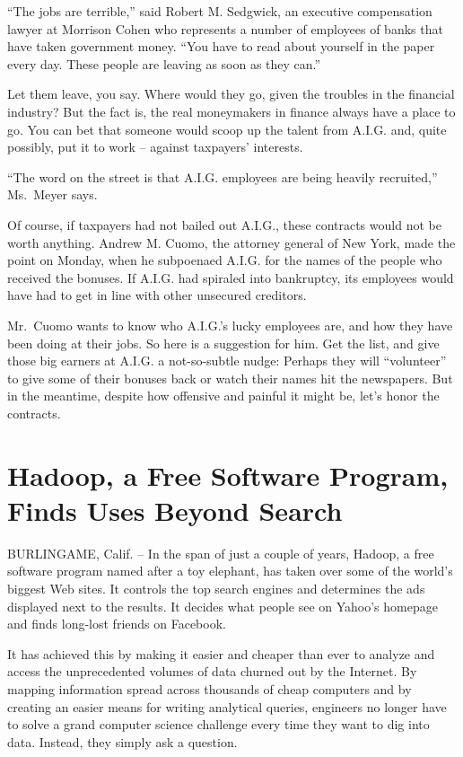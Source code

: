 \documentclass[12pt,a4paper,onecolumn]{article}
\begin{document}
\begin{CJK*}{GBK}{song}
``The jobs are terrible,'' said Robert M. Sedgwick, an executive compensation lawyer at Morrison
Cohen who represents a number of employees of banks that have taken government money. ``You have to
read about yourself in the paper every day. These people are leaving as soon as they can.''

Let them leave, you say. Where would they go, given the troubles in the financial industry? But the
fact is, the real moneymakers in finance always have a place to go. You can bet that someone would
scoop up the talent from A.I.G. and, quite possibly, put it to work -- against taxpayers' interests.

``The word on the street is that A.I.G. employees are being heavily recruited,'' Ms.~Meyer says.

Of course, if taxpayers had not bailed out A.I.G., these contracts would not be worth anything.
Andrew M. Cuomo, the attorney general of New York, made the point on Monday, when he subpoenaed
A.I.G. for the names of the people who received the bonuses. If A.I.G. had spiraled into bankruptcy,
its employees would have had to get in line with other unsecured creditors.

Mr.~Cuomo wants to know who A.I.G.'s lucky employees are, and how they have been doing at their
jobs. So here is a suggestion for him. Get the list, and give those big earners at A.I.G. a
not-so-subtle nudge: Perhaps they will ``volunteer'' to give some of their bonuses back or watch
their names hit the newspapers. But in the meantime, despite how offensive and painful it might be,
let's honor the contracts.

\section{Hadoop, a Free Software Program, Finds Uses Beyond Search}

BURLINGAME, Calif. -- In the span of just a couple of years, Hadoop, a free software program named
after a toy elephant, has taken over some of the world's biggest Web sites. It controls the top
search engines and determines the ads displayed next to the results. It decides what people see on
Yahoo's homepage and finds long-lost friends on Facebook.

It has achieved this by making it easier and cheaper than ever to analyze and access the
unprecedented volumes of data churned out by the Internet. By mapping information spread across
thousands of cheap computers and by creating an easier means for writing analytical queries,
engineers no longer have to solve a grand computer science challenge every time they want to dig
into data. Instead, they simply ask a question.


\end{CJK*}
\end{document}
